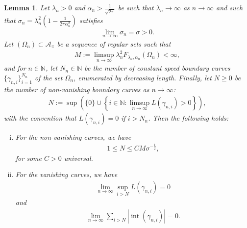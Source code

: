 \documentclass[11pt]{article}
\newcounter{statement}
\numberwithin{statement}{section}
\numberwithin{equation}{section}
\newtheorem{lemma}[statement]{Lemma}
\theoremstyle{remark}
\newcommand{\N}{\mathbb N}
\begin{document}
  \begin{lemma}\label{lemma:finite}
    Let $\lambda_n > 0$ and $\alpha_n >\frac{1}{\sqrt{2\pi}}$ be
      such that $\lambda_n \to \infty$ as $n \to \infty$ and such
      that
    $\sigma_n = \lambda_n^2 \left( 1- \frac{1}{2\pi \alpha_n^2}
    \right)$ satisfies
	\begin{align}
         \lim_{n\to \infty} \sigma_n = \sigma >0.
	\end{align}
	Let $(\Omega_{n}) \subset \mathcal{A}_\pi$ be a sequence of
        regular sets such that
        \begin{align}
          \label{eq:Flam2M}
                  M := \limsup_{n \to \infty} \lambda_n^2 F_{\lambda_n,
                  \alpha_n} (\Omega_{n}) <\infty,
                \end{align}
                and for $n \in \N$, let $N_n \in \N$ be the number of
                constant speed boundary curves
                $\{\gamma_{n,i}\}_{i=1}^{N_n}$ of the
                set $\Omega_n$, enumerated by
                decreasing length.  Finally, let $N \geq 0$ be the
                  number of non-vanishing boundary curves as
                  $n \to \infty$:
	\begin{align}\label{eq:N}
          N:= \sup \left( \{0\} \cup \left\{ i \in \N: \limsup_{n \to \infty} L(
          \gamma_{n,i}) >0 \right\} \right),
	\end{align}
	with the convention that $L(\gamma_{n,i}) = 0$ if $i > N_n$.
        Then the following holds:
        \begin{enumerate}[i)]
        \item For the non-vanishing curves, we have
          \begin{align}\label{eq:def_n_max}
            1 \leq N\leq C M\sigma^{-\frac{1}{2}},
          \end{align}
          for some $C > 0$ universal. 
                
        \item For the vanishing curves, we have
	\begin{align}\label{eq:vanishing_curves}
		\lim_{n \to \infty} \sup_{i> N} L(\gamma_{n,i}) = 0
	\end{align}
	and
	\begin{align}\label{eq:convergence_short_curves}
          \lim_{n\to \infty} \sum_{i > N} | \operatorname{int}(\gamma_{n,i})|= 0.
	\end{align}
      \end{enumerate}
      
    \end{lemma}
\end{document}
